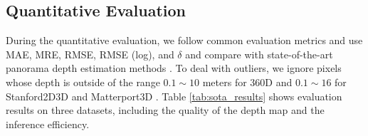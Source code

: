\subsection{Quantitative Evaluation}

During the quantitative evaluation,  we follow common evaluation metrics \cite{wang2020bifuse} and use MAE, MRE, RMSE, RMSE (log), and $\delta$ and compare with state-of-the-art panorama depth estimation methods \cite{wang2020bifuse,jiang2021unifuse,pintore2021slicenet,shen2022panoformer,li2022omnifusion,yan2022spheredepth,sun2021hohonet}.
To deal with outliers, we ignore pixels whose depth is outside of the range $0.1 \sim 10$ meters for 360D \cite{zioulis2018omnidepth} and $0.1 \sim 16$ for Stanford2D3D \cite{armeni2017joint} and Matterport3D \cite{chang2017matterport3d}. 
Table \ref{tab:sota_results} shows evaluation results on three datasets, including the quality of the depth map and the inference efficiency.




